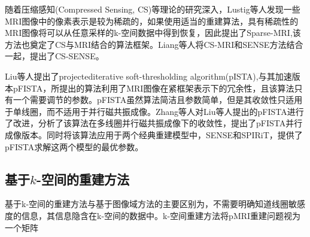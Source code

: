 \documentclass[lang=cn,11pt,a4paper,cite=numbers]{elegantpaper}
\begin{document}
\par 随着压缩感知(Compressed Sensing, CS)等理论的研究深入，Lustig等人发现一些MRI图像中的像素表示是较为稀疏的，如果使用适当的重建算法，具有稀疏性的MRI图像将可以从任意采样的k-空间数据中得到恢复，因此提出了Sparse-MRI\cite{lustig2007sparse},该方法也奠定了CS与MRI结合的算法框架。Liang等人将CS-MRI和SENSE方法结合一起，提出了CS-SENSE\cite{liang2009accelerating}。

\par Liu等人提出了projectediterative soft-thresholding algorithm(pISTA),与其加速版本pFISTA\cite{7448403}，所提出的算法利用了MRI图像在紧框架表示下的冗余性，且该算法只有一个需要调节的参数。pFISTA虽然算法简洁且参数简单，但是其收敛性只适用于单线圈，而不适用于并行磁共振成像。Zhang等人对Liu等人提出的pFISTA进行了改进，分析了该算法在多线圈并行磁共振成像下的收敛性，提出了pFISTA并行成像版本\cite{ZHANG2021101987}。同时将该算法应用于两个经典重建模型中，SENSE\cite{pruessmann1999sense}和SPIRiT\cite{lustig2010spirit}，提供了pFISTA求解这两个模型的最优参数。

\subsection{基于$k$-空间的重建方法} 
\par 基于k-空间的重建方法与基于图像域方法的主要区别为，不需要明确知道线圈敏感度的信息，其信息隐含在k-空间的数据中。k-空间重建方法将pMRI重建问题视为一个矩阵



\newpage


\end{document}
